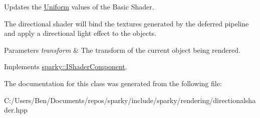 Updates the \hyperlink{classsparky_1_1_uniform}{Uniform} values of the Basic Shader. 

The directional shader will bind the textures generated by the deferred pipeline and apply a directional light effect to the objects.


\begin{DoxyParams}{Parameters}
{\em transform} & The transform of the current object being rendered. \\
\hline
\end{DoxyParams}


Implements \hyperlink{classsparky_1_1_i_shader_component_a0bf4ef38fcf1ac17fd1852668baeef88}{sparky\+::\+I\+Shader\+Component}.



The documentation for this class was generated from the following file\+:\begin{DoxyCompactItemize}
\item 
C\+:/\+Users/\+Ben/\+Documents/repos/sparky/include/sparky/rendering/directionalshader.\+hpp\end{DoxyCompactItemize}
